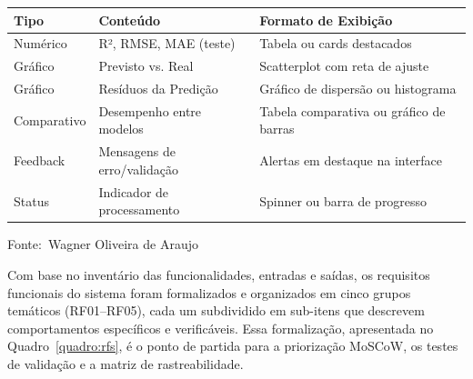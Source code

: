 \documentclass[12pt,a4paper]{article}
\newcommand{\oautor}{Wagner Oliveira de Araujo}
\begin{document}
\begin{quadro}[ht]
\centering
\small
\caption{Saídas esperadas do sistema}
\label{quadro:saidas}
\begin{threeparttable}
\begin{tabularx}{\textwidth}{|l|l|X|} \hline
\textbf{Tipo} & \textbf{Conteúdo} & \textbf{Formato de Exibição} \\ \hline
Numérico & R², RMSE, MAE (teste) & Tabela ou cards destacados \\ \hline
Gráfico & Previsto vs. Real & Scatterplot com reta de ajuste \\ \hline
Gráfico & Resíduos da Predição & Gráfico de dispersão ou histograma \\ \hline
Comparativo & Desempenho entre modelos & Tabela comparativa ou gráfico de barras \\ \hline
Feedback & Mensagens de erro/validação & Alertas em destaque na interface \\ \hline
Status & Indicador de processamento & Spinner ou barra de progresso \\ \hline
\end{tabularx}
\begin{tablenotes}[flushleft]
\footnotesize
\item Fonte:~\oautor
\end{tablenotes}
\end{threeparttable}
\end{quadro}


\newpage
Com base no inventário das funcionalidades, entradas e saídas, os requisitos funcionais do sistema foram formalizados e organizados em cinco grupos temáticos (RF01--RF05), cada um subdividido em sub-itens que descrevem comportamentos específicos e verificáveis. Essa formalização, apresentada no Quadro~\ref{quadro:rfs}, é o ponto de partida para a priorização MoSCoW, os testes de validação e a matriz de rastreabilidade.
\end{document}
